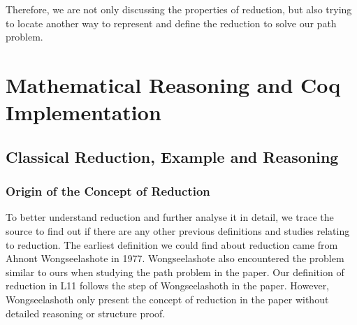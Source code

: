 \documentclass[a4paper,12pt,twoside,openright]{report}
\begin{document}
Therefore, we are not only discussing the properties of reduction, but also trying to locate another way to represent and define the reduction to solve our path problem.



%
%
%

\chapter{Mathematical Reasoning and Coq Implementation} 


\section{Classical Reduction, Example and Reasoning}
\subsection{Origin of the Concept of Reduction}
To better understand reduction and further analyse it in detail, we trace the source to find out if there are any other previous definitions and studies relating to reduction. 
The earliest definition we could find about reduction came from Ahnont Wongseelashote in 1977\cite{WONGSEELASHOTE197955}. Wongseelashote also encountered the problem similar to ours when studying the path problem in the paper. Our definition of reduction in L11 follows the step of Wongseelashoth in the paper. However, Wongseelashoth only present the concept of reduction in the paper without detailed reasoning or structure proof.
\end{document}
